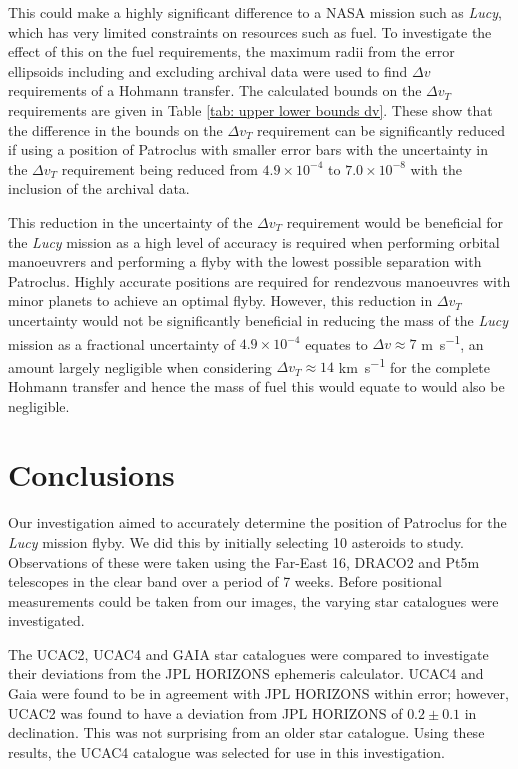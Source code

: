 \documentclass[10pt, twocolumn]{revtex4}    %
\newcommand{\Lucy}{\textit{Lucy }}
\begin{document}
This could make a highly significant difference to a NASA mission such as \textit{Lucy}, which has very limited constraints on resources such as fuel. To investigate the effect of this on the fuel requirements, the maximum radii from the error ellipsoids including and excluding archival data were used to find $\Delta v$ requirements of a Hohmann transfer. The calculated bounds on the $\Delta v_{T}$ requirements are given in Table \ref{tab: upper lower bounds dv}. These show that the difference in the bounds on the $\Delta v_{T}$ requirement can be significantly reduced if using a position of Patroclus with smaller error bars with the uncertainty in the $\Delta v_{T}$ requirement being reduced from $4.9 \times 10^{-4}$ to $7.0 \times 10^{-8}$ with the inclusion of the archival data. 

This reduction in the uncertainty of the $\Delta v_{T}$ requirement would be beneficial for the \Lucy mission as a high level of accuracy is required when performing orbital manoeuvrers and performing a flyby with the lowest possible separation with Patroclus. Highly accurate positions are required for rendezvous manoeuvres with minor planets to achieve an optimal flyby. However, this reduction in $\Delta v_{T}$ uncertainty would not be significantly beneficial in reducing the mass of the \Lucy mission as a fractional uncertainty of $4.9 \times 10^{-4}$ equates to $\Delta v \approx 7$ \si{\metre\per\second}, an amount largely negligible when considering $\Delta v_{T} \approx 14$ \si{\km\per\s} for the complete Hohmann transfer and hence the mass of fuel this would equate to would also be negligible.

\section{Conclusions}

Our investigation aimed to accurately determine the position of Patroclus for the \Lucy mission flyby. We did this by initially selecting 10 asteroids to study. Observations of these were taken using the Far-East 16, DRACO2 and Pt5m telescopes in the clear band over a period of 7 weeks. Before positional measurements could be taken from our images, the varying star catalogues were investigated.

The UCAC2, UCAC4 and GAIA star catalogues were compared to investigate their deviations from the JPL HORIZONS ephemeris calculator. UCAC4 and Gaia were found to be in agreement with JPL HORIZONS within error; however, UCAC2 was found to have a deviation from JPL HORIZONS of $0.2 \pm 0.1$ in declination. This was not surprising from an older star catalogue. Using these results, the UCAC4 catalogue was selected for use in this investigation.
\end{document}
